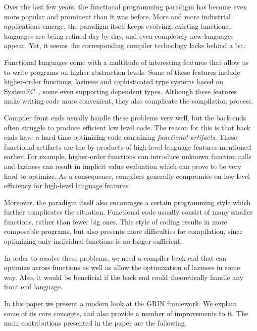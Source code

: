 \documentclass[main.tex]{subfiles}
\begin{document}
	
	Over the last few years, the functional programming paradigm has become even more popular and prominent than it was before. More and more industrial applications emerge, the paradigm itself keeps evolving, existing functional languages are being refined day by day, and even completely new languages appear. Yet, it seems the corresponding compiler technology lacks behind a bit.
	
	Functional languages come with a multitude of interesting features that allow us to write programs on higher abstraction levels. Some of these features include higher-order functions, laziness and sophisticated type systems based on SystemFC~\cite{systemfc}, some even supporting dependent types. Although these features make writing code more convenient, they also complicate the compilation process.
	
	Compiler front ends usually handle these problems very well, but the back ends often struggle to produce efficient low level code. The reason for this is that back ends have a hard time optimizing code containing \emph{functional artifacts}. These functional artifacts are the by-products of high-level language features mentioned earlier. For example, higher-order functions can introduce unknown function calls and laziness can result in implicit value evaluation which can prove to be very hard to optimize. As a consequence, compilers generally compromise on low level efficiency for high-level language features.
	
	Moreover, the paradigm itself also encourages a certain programming style which further complicates the situation. Functional code usually consist of many smaller functions, rather than fewer big ones. This style of coding results in more composable programs, but also presents more difficulties for compilation, since optimizing only individual functions is no longer sufficient. 
	
	In order to resolve these problems, we need a compiler back end that can optimize across functions as well as allow the optimization of laziness in some way. Also, it would be beneficial if the back end could theoretically handle any front end language.
	
	In this paper we present a modern look at the GRIN framework. We explain some of its core concepts, and also provide a number of improvements to it. The main contributions presented in the paper are the following.
	
\end{document}

